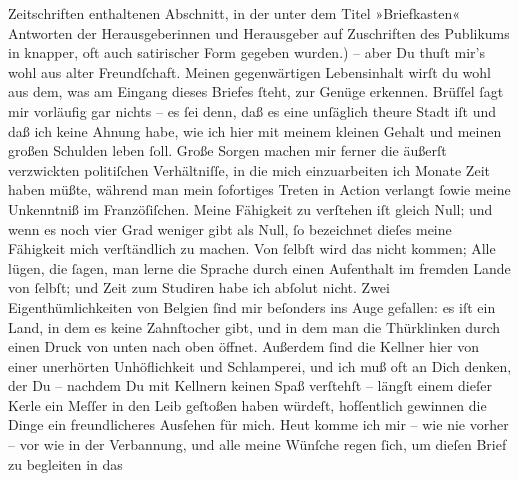 \begin{ledgroupsized}[t]{13cm}
{{{                  Zeitschriften enthaltenen Abschnitt, in der unter dem Titel »Briefkasten«
                  Antworten der Herausgeberinnen und Herausgeber auf Zuschriften des Publikums in
                  knapper, oft auch satirischer Form gegeben wurden.}}}\label{K_L02663-4h}) – aber Du thuſt mir’s
               wohl aus alter Freundſchaft.\pend
           \pstart
           Meinen gegenwärtigen Lebensinhalt wirſt du wohl aus dem, was am Eingang dieses
               Briefes ſteht, zur Genüge erkennen. Brüſſel ſagt
               mir vorläufig gar nichts – es ſei denn, daß es eine unſäglich theure Stadt iſt und daß ich keine Ahnung habe, wie
               ich hier mit meinem kleinen Gehalt und meinen großen Schulden leben ſoll. Große
               Sorgen machen mir ferner die äußerſt verzwickten politiſchen Verhältniſſe, in die
               mich einzuarbeiten ich Monate Zeit haben müßte, während man {\pb}mein ſofortiges Treten in Action verlangt ſowie
               meine Unkenntniß im Franzöſiſchen. Meine Fähigkeit zu verſtehen iſt gleich Null; und
               wenn es noch vier Grad weniger gibt als Null, ſo bezeichnet dieſes meine Fähigkeit
               mich verſtändlich zu machen. Von ſelbſt wird das nicht kommen; Alle lügen, die ſagen,
               man lerne die Sprache durch einen Aufenthalt im fremden Lande von ſelbſt; und Zeit
               zum Studiren habe ich abſolut nicht. Zwei Eigenthümlichkeiten von Belgien ſind mir beſonders ins Auge gefallen: es iſt ein Land, in dem es keine
               Zahnſtocher gibt, und in dem man die Thürklinken durch einen Druck von unten nach
               oben öffnet. Außerdem ſind die Kellner hier von einer unerhörten Unhöflichkeit und
               Schlamperei, und ich muß oft an Dich denken, der Du – nachdem Du mit Kellnern keinen
               Spaß verſtehſt – längſt einem dieſer Kerle ein Meſſer in den Leib geſtoßen haben
               würdeſt, hofſentlich gewinnen die Dinge ein freundlicheres Ausſehen für mich. Heut komme ich mir – wie nie vorher – vor wie in der
               Verbannung, und alle meine Wünſche regen ſich, um dieſen Brief zu begleiten in das
                  \label{K_L02663-999v}
\end{ledgroupsized}

